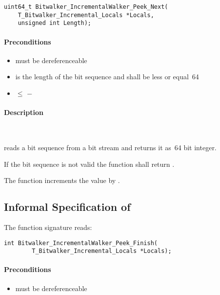 \begin{lstlisting}[style=acsl-block]
uint64_t Bitwalker_IncrementalWalker_Peek_Next(
    T_Bitwalker_Incremental_Locals *Locals,
    unsigned int Length);
\end{lstlisting}


\paragraph{Preconditions}
\begin{itemize}
  \item  {} must be dereferenceable
  \item {} is the length of the bit sequence and shall be less or equal~64
  \item {} $\leq$  $-$ 
\end{itemize}

\paragraph{Description}~

\peeknext reads a bit sequence from a bit stream and returns it as~64 bit integer.


If the bit sequence is not valid the function shall return .

The function increments the value  by .


\clearpage

\subsection{Informal Specification of }


 The function signature reads:\\[1em]

\begin{lstlisting}[style=acsl-block]
int Bitwalker_IncrementalWalker_Peek_Finish(
        T_Bitwalker_Incremental_Locals *Locals);
\end{lstlisting}

\paragraph{Preconditions}
\begin{itemize}
   \item  {} must be dereferenceable
\end{itemize}

